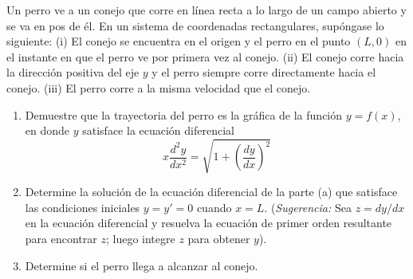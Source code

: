 \item Un perro ve a un conejo que corre en línea recta a lo largo de un campo abierto y se va en pos de él. En un sistema de coordenadas rectangulares, supóngase lo siguiente: 
    (i) El conejo se encuentra en el origen y el perro en el punto $(L, 0)$ en el instante en que el perro ve por primera vez al conejo. 
    (ii) El conejo corre hacia la dirección positiva del eje $y$ y el perro siempre corre directamente hacia el conejo. 
    (iii) El perro corre a la misma velocidad que el conejo.
    \begin{enumerate}
        \item[(a)] Demuestre que la trayectoria del perro es la gráfica de la función $y = f(x)$, en donde $y$ satisface la ecuación diferencial
        \[ x \frac{d^2y}{dx^2} = \sqrt{1 + \left(\frac{dy}{dx}\right)^2} \]
        \item[(b)] Determine la solución de la ecuación diferencial de la parte (a) que satisface las condiciones iniciales $y = y' = 0$ cuando $x = L$. (\textit{Sugerencia:} Sea $z = dy/dx$ en la ecuación diferencial y resuelva la ecuación de primer orden resultante para encontrar $z$; luego integre $z$ para obtener $y$).
        \item[(c)] Determine si el perro llega a alcanzar al conejo.
    \end{enumerate}
    
    \begin{center}
    \end{center}
